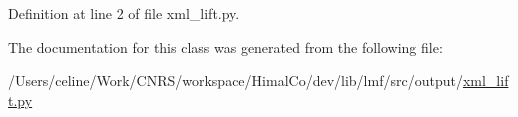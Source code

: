 Definition at line 2 of file xml\+\_\+lift.\+py.



The documentation for this class was generated from the following file\+:\begin{DoxyCompactItemize}
\item 
/\+Users/celine/\+Work/\+C\+N\+R\+S/workspace/\+Himal\+Co/dev/lib/lmf/src/output/\hyperlink{xml__lift_8py}{xml\+\_\+lift.\+py}\end{DoxyCompactItemize}
